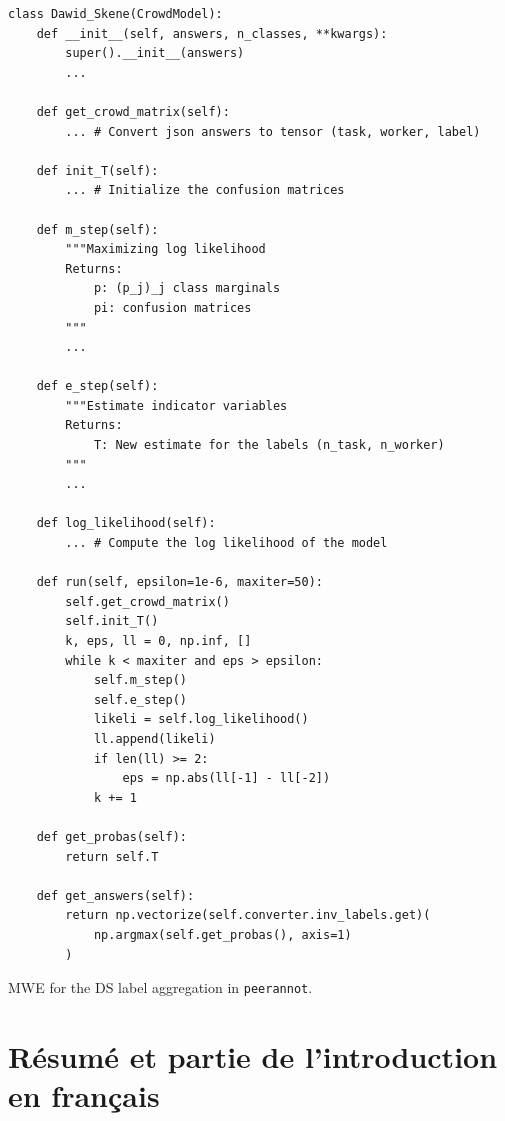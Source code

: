 \begin{listing}[ht]
    \begin{verbatim}
class Dawid_Skene(CrowdModel):
    def __init__(self, answers, n_classes, **kwargs):
        super().__init__(answers)
        ...

    def get_crowd_matrix(self):
        ... # Convert json answers to tensor (task, worker, label)

    def init_T(self):
        ... # Initialize the confusion matrices

    def m_step(self):
        """Maximizing log likelihood
        Returns:
            p: (p_j)_j class marginals
            pi: confusion matrices
        """
        ...

    def e_step(self):
        """Estimate indicator variables
        Returns:
            T: New estimate for the labels (n_task, n_worker)
        """
        ...

    def log_likelihood(self):
        ... # Compute the log likelihood of the model

    def run(self, epsilon=1e-6, maxiter=50):
        self.get_crowd_matrix()
        self.init_T()
        k, eps, ll = 0, np.inf, []
        while k < maxiter and eps > epsilon:
            self.m_step()
            self.e_step()
            likeli = self.log_likelihood()
            ll.append(likeli)
            if len(ll) >= 2:
                eps = np.abs(ll[-1] - ll[-2])
            k += 1

    def get_probas(self):
        return self.T

    def get_answers(self):
        return np.vectorize(self.converter.inv_labels.get)(
            np.argmax(self.get_probas(), axis=1)
        )
\end{verbatim}
\caption{MWE for the DS label aggregation in \texttt{peerannot}.}
\label{listing:DS}
\end{listing}

\chapter{Résumé et partie de l'introduction en français}
\label{chap:vf}

